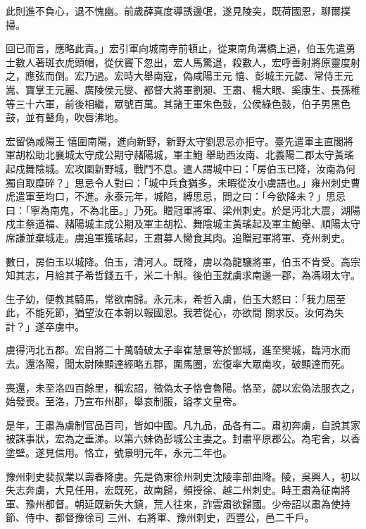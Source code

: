 \begin{pinyinscope}
 此則進不負心，退不愧幽。前歲薛真度導誘邊氓，遂見陵突，既荷國恩，聊爾撲掃。



 回已而言，應略此責。」宏引軍向城南寺前頓止，從東南角溝橋上過，伯玉先遣勇士數人著斑衣虎頭帽，從伏竇下忽出，宏人馬驚退，殺數人，宏呼善射將原靈度射之，應弦而倒。宏乃過。宏時大舉南寇，偽咸陽王元憘、彭城王元勰、常侍王元嵩、寶掌王元麗、廣陵侯元燮、都督大將軍劉昶、王肅、楊大眼、奚康生、長孫稚等三十六軍，前後相繼，眾號百萬。其諸王軍朱色鼓，公侯綠色鼓，伯子男黑色鼓，並有鼙角，吹唇沸地。



 宏留偽咸陽王憘圍南陽，進向新野，新野太守劉思忌亦拒守。臺先遣軍主直閣將軍胡松助北襄城太守成公期守赭陽城，軍主鮑
 舉助西汝南、北義陽二郡太守黃瑤起戍舞陰城。宏攻圍新野城，戰鬥不息。遣人謂城中曰：「房伯玉已降，汝南為何獨自取糜碎？」思忌令人對曰：「城中兵食猶多，未暇從汝小虜語也。」雍州刺史曹虎遣軍至均口，不進。永泰元年，城陷，縛思忌，問之曰：「今欲降未？」思忌曰：「寧為南鬼，不為北臣。」乃死。贈冠軍將軍、梁州刺史。於是沔北大震，湖陽戍主蔡道福、赭陽城主成公期及軍主胡松、舞陰城主黃瑤起及軍主鮑舉、順陽太守席謙並棄城走。虜追軍獲瑤起，王肅募人臠食其肉。追贈冠軍將軍、兗州刺史。



 數日，房伯玉以城降。伯玉，清河人。既降，虜以為龍驤將軍，伯玉不肯受。高宗知其志，月給其子希哲錢五千，米二十斛。後伯玉就虜求南邊一郡，為馮翊太守。



 生子幼，便教其騎馬，常欲南歸。永元末，希哲入虜，伯玉大怒曰：「我力屈至此，不能死節，猶望汝在本朝以報國恩。我若從心，亦欲間
 關求反。汝何為失計？」遂卒虜中。



 虜得沔北五郡。宏自將二十萬騎破太子率崔慧景等於鄧城，進至樊城，臨沔水而去。還洛陽，聞太尉陳顯達經略五郡，圍馬圈，宏復率大眾南攻，破顯達而死。



 喪還，未至洛四百餘里，稱宏詔，徵偽太子恪會魯陽。恪至，勰以宏偽法服衣之，始發喪。至洛，乃宣布州郡，舉哀制服，謚孝文皇帝。



 是年，王肅為虜制官品百司，皆如中國。凡九品，品各有二。肅初奔虜，自說其家被誅事狀，宏為之垂涕。以第六妹偽彭城公主妻之。封肅平原郡公。為宅舍，以香塗壁。遂見信用。恪立，號景明元年，永元二年也。



 豫州刺史裴叔業以壽春降虜。先是偽東徐州刺史沈陵率部曲降。陵，吳興人，初以失志奔虜，大見任用，宏既死，故南歸，頻授徐、越二州刺史。時王肅為征南將軍、豫州都督。朝延既新失大鎮，荒人往來，詐雲肅欲歸國。少帝詔以肅為使持節、侍中、都督豫徐司
 三州、右將軍、豫州刺史，西豐公，邑二千戶。




\end{pinyinscope}
